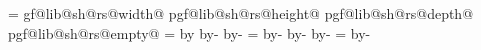 {{{{                                \pgf@yb=\dp\pgf@lib@sh@box%
                            \fi%
                        \fi%
                    \fi%
                \fi%
                \expandafter\edef\csname pgf@lib@sh@rs@width@\pgf@lib@sh@rs@number\endcsname{\the\pgf@xa}%
                \expandafter\edef\csname pgf@lib@sh@rs@height@\pgf@lib@sh@rs@number\endcsname{\the\pgf@ya}%
                \expandafter\edef\csname pgf@lib@sh@rs@depth@\pgf@lib@sh@rs@number\endcsname{\the\pgf@yb}%
                \expandafter\addtosavedmacro\csname pgf@lib@sh@rs@empty@\pgf@lib@sh@rs@number\endcsname%
                \ifdim\pgf@xa>\pgf@x%
                    \pgf@x=\pgf@xa%
                \fi%
                \ifdim\pgf@ya>\pgfutil@tempdima%
                    \pgfutil@tempdima=\pgf@ya%
                \fi%
                \ifdim\pgf@yb>\pgfutil@tempdimb%
                    \pgfutil@tempdimb=\pgf@yb%
                \fi%
                \pgf@yc=\pgfutil@tempdima%
                \advance\pgf@yc by\pgfutil@tempdimb%
                \ifdim\pgf@yc>\pgf@y%
                    \pgf@y=\pgf@yc%
                \fi%
        \repeatpgfmathloop%
        \edef\pgf@lib@sh@rs@max@width{\the\pgf@x}%
        \edef\pgf@lib@sh@rs@max@totalheight{\the\pgf@y}%
        \pgfmathsetlength{}%
        \advance\pgf@x by-\innerxsep\relax%
        \advance\pgf@x by-\innerxsep\relax%
        \pgf@xa=\pgf@x%
        \advance\pgf@xa by-\pgf@lib@sh@rs@max@width\relax%
        \ifdim\pgf@xa>0pt\relax%
            \edef\pgf@lib@sh@rs@max@width{\the\pgf@x}%
        \fi%
        \pgfmathsetlength{}%
        \advance\pgf@y by-\innerysep\relax%
        \advance\pgf@y by-\innerysep\relax%
        \pgf@ya=\pgf@y%
        \advance\pgf@ya by-\pgf@lib@sh@rs@max@totalheight\relax%
        \ifdim\pgf@ya>0pt\relax%
            \edef\pgf@lib@sh@rs@max@totalheight{\the\pgf@y}%
        \fi%
        \ifpgfrectanglesplithorizontal%
            \pgf@x=0pt\relax%
}}}}
